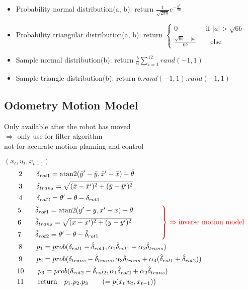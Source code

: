 \begin{itemize}
	\item Probability normal distribution(a, b): \qquad return $\displaystyle \frac{1}{\sqrt{2\pi b}}e^{-\frac{a^2}{2b}}$
	\item Probability triangular distribution(a, b): \qquad return $\displaystyle \begin{cases}
		0 \qquad\qquad \text{if } |a| > \sqrt{6b}\\
		\frac{\sqrt{6b} - |a|}{6b} \qquad \text{else}
	\end{cases}$
	\item Sample normal distribution(b): \qquad return $\displaystyle \frac{b}{6} \sum_{i=1}^{12} rand(-1, 1)$
	\item Sample triangle distribution(b): \qquad return $b.rand(-1,1).rand(-1,1)$
\end{itemize}

\subsection{Odometry Motion Model}
Only available after the robot has moved\\
$\Rightarrow$ only use for filter algorithm\\
not for accurate motion planning and control

 $(x_t, u_t, x_{t-1})$
\begin{align*}
	& \;2 \qquad \delta_{rot1} = \text{atan2}(\bar{y}'-\bar{y}, \bar{x}'-\bar{x}) - \bar{\theta} \\
	& \;3 \qquad \delta_{trans} = \sqrt{(\bar{x}-\bar{x}')^2 + (\bar{y}-\bar{y}')^2} \\
	& \;4 \qquad \delta_{rot2} = \bar{\theta}' - \bar{\theta} - \delta_{rot1} \\
	& {\color{red} \begin{rcases}
		{\color{black} 5 \qquad \hat{\delta}_{rot1} = \text{atan2}(y'-y, x'-x) - \theta} \qquad\qquad \\
		{\color{black} 6 \qquad \hat{\delta}_{trans} = \sqrt{(x-x')^2 + (y-y')^2}} \\
		{\color{black} 7 \qquad \hat{\delta}_{rot2} = \theta' - \theta - \hat{\delta}_{rot1}}
	\end{rcases} \Rightarrow \text{inverse motion model}} \\	
	& \;8 \qquad p_1 = prob(\delta_{rot1} - \hat{\delta}_{rot1}, \alpha_1 \hat{\delta}_{rot1} + \alpha_2 \hat{\delta}_{trans}) \\
	& \;9 \qquad  p_2 = prob(\delta_{trans} - \hat{\delta}_{trans}, \alpha_3 \hat{\delta}_{trans} + \alpha_4 (\hat{\delta}_{rot1} + \hat{\delta}_{rot2})) \\
	& 10 \qquad  p_3 = prob(\delta_{rot2} - \hat{\delta}_{rot2}, \alpha_1 \hat{\delta}_{rot2} + \alpha_2 \hat{\delta}_{trans}) \\
	& 11 \qquad \text{return}\quad p_1.p_2.p_3 \qquad (=p(x_t| u_t, x_{t-1}))
\end{align*}


